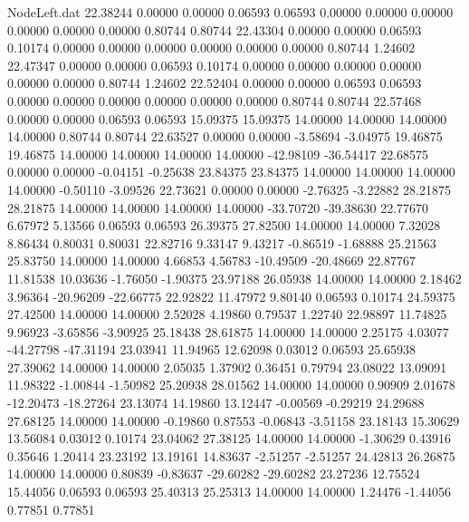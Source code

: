 \begin{filecontents}{NodeLeft.dat}
  22.38244    0.00000    0.00000     0.06593    0.06593    0.00000    0.00000    0.00000    0.00000    0.00000    0.00000    0.80744    0.80744
  22.43304    0.00000    0.00000     0.06593    0.10174    0.00000    0.00000    0.00000    0.00000    0.00000    0.00000    0.80744    1.24602
  22.47347    0.00000    0.00000     0.06593    0.10174    0.00000    0.00000    0.00000    0.00000    0.00000    0.00000    0.80744    1.24602
  22.52404    0.00000    0.00000     0.06593    0.06593    0.00000    0.00000    0.00000    0.00000    0.00000    0.00000    0.80744    0.80744
  22.57468    0.00000    0.00000     0.06593    0.06593   15.09375   15.09375   14.00000   14.00000   14.00000   14.00000    0.80744    0.80744
  22.63527    0.00000    0.00000    -3.58694   -3.04975   19.46875   19.46875   14.00000   14.00000   14.00000   14.00000  -42.98109  -36.54417
  22.68575    0.00000    0.00000    -0.04151   -0.25638   23.84375   23.84375   14.00000   14.00000   14.00000   14.00000   -0.50110   -3.09526
  22.73621    0.00000    0.00000    -2.76325   -3.22882   28.21875   28.21875   14.00000   14.00000   14.00000   14.00000  -33.70720  -39.38630
  22.77670    6.67972    5.13566     0.06593    0.06593   26.39375   27.82500   14.00000   14.00000    7.32028    8.86434    0.80031    0.80031
  22.82716    9.33147    9.43217    -0.86519   -1.68888   25.21563   25.83750   14.00000   14.00000    4.66853    4.56783  -10.49509  -20.48669
  22.87767   11.81538   10.03636    -1.76050   -1.90375   23.97188   26.05938   14.00000   14.00000    2.18462    3.96364  -20.96209  -22.66775
  22.92822   11.47972    9.80140     0.06593    0.10174   24.59375   27.42500   14.00000   14.00000    2.52028    4.19860    0.79537    1.22740
  22.98897   11.74825    9.96923    -3.65856   -3.90925   25.18438   28.61875   14.00000   14.00000    2.25175    4.03077  -44.27798  -47.31194
  23.03941   11.94965   12.62098     0.03012    0.06593   25.65938   27.39062   14.00000   14.00000    2.05035    1.37902    0.36451    0.79794
  23.08022   13.09091   11.98322    -1.00844   -1.50982   25.20938   28.01562   14.00000   14.00000    0.90909    2.01678  -12.20473  -18.27264
  23.13074   14.19860   13.12447    -0.00569   -0.29219   24.29688   27.68125   14.00000   14.00000   -0.19860    0.87553   -0.06843   -3.51158
  23.18143   15.30629   13.56084     0.03012    0.10174   23.04062   27.38125   14.00000   14.00000   -1.30629    0.43916    0.35646    1.20414
  23.23192   13.19161   14.83637    -2.51257   -2.51257   24.42813   26.26875   14.00000   14.00000    0.80839   -0.83637  -29.60282  -29.60282
  23.27236   12.75524   15.44056     0.06593    0.06593   25.40313   25.25313   14.00000   14.00000    1.24476   -1.44056    0.77851    0.77851

\end{filecontents}
